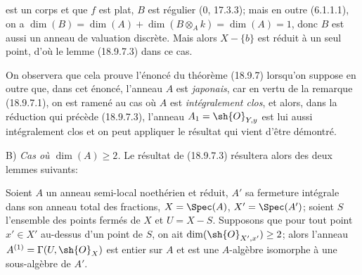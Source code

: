 
est un corps et que $f$ est plat, $B$ est régulier (0, 17.3.3); mais en outre (6.1.1.1), on a $\dim(B)=\dim(A)+\dim(B\otimes_A k)=\dim(A)=1$, donc $B$ est aussi un anneau de valuation discrète. Mais alors $X-\{b\}$ est réduit à un seul point, d'où le lemme (18.9.7.3) dans ce cas.

On observera que cela prouve l'énoncé du théorème (18.9.7) lorsqu'on suppose en outre que, dans cet énoncé, l'anneau $A$ est \emph{japonais}, car en vertu de la remarque (18.9.7.1), on est ramené au cas où $A$ est \emph{intégralement clos}, et alors, dans la réduction qui précède (18.9.7.3), l'anneau $A_1=\sh{O}_{Y,y}$ est lui aussi intégralement clos et on peut appliquer le résultat qui vient d'être démontré.

B) \emph{Cas où $\dim(A)\geq 2$.} Le résultat de (18.9.7.3) résultera alors des deux lemmes suivants:

\begin{lemma}[18.9.7.5]
\label{IV.18.9.7.5}
Soient $A$ un anneau semi-local noethérien et réduit, $A'$ sa fermeture intégrale dans son anneau total des fractions, $X=\Spec(A)$, $X'=\Spec(A')$; soient $S$ l'ensemble des points fermés de $X$ et $U=X-S$. Supposons que pour tout point $x'\in X'$ au-dessus d'un point de $S$, on ait $\dim(\sh{O}_{X',x'})\geq 2$; alors l'anneau $A^{(1)}=\Gamma(U,\sh{O}_X)$ est entier sur $A$ et est une $A$-algèbre isomorphe à une sous-algèbre de $A'$.
\end{lemma}

